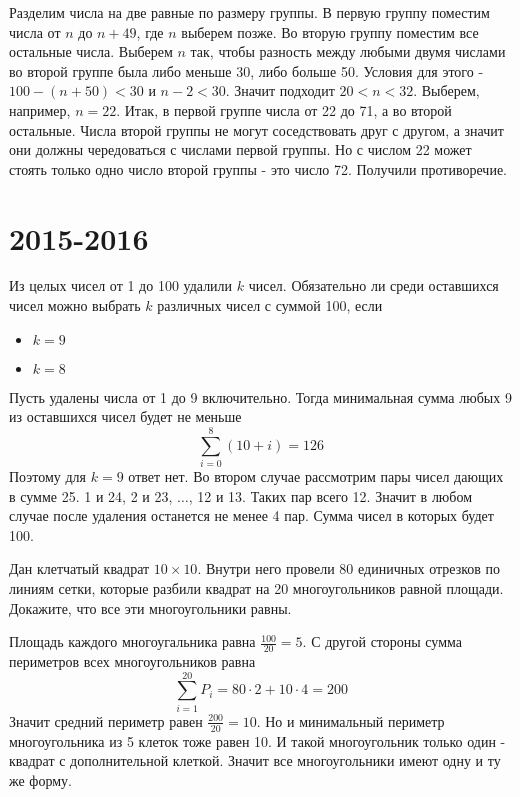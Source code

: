 \documentclass[11pt, a4paper]{template}
\begin{document}
\begin{solution}
Разделим числа на две равные по размеру группы. В первую группу поместим числа от $n$ до $n + 49$, где $n$ выберем позже. Во вторую группу поместим все остальные числа. Выберем $n$ так, чтобы разность между любыми двумя числами во второй группе была либо меньше 30, либо больше 50. Условия для этого - $100 - (n + 50) < 30$ и $n - 2 < 30$. Значит подходит $20 < n < 32$. Выберем, например, $n = 22$. Итак, в первой группе числа от 22 до 71, а во второй остальные. Числа второй группы не могут соседствовать друг с другом, а значит они должны чередоваться с числами первой группы. Но с числом 22 может стоять только одно число второй группы - это число 72. Получили противоречие.
\end{solution}

\chapter{2015-2016}

\begin{exercise}
Из целых чисел от 1 до 100 удалили $k$ чисел. Обязательно ли среди оставшихся чисел можно выбрать $k$ различных чисел с суммой 100, если
\begin{itemize}
\item $k = 9$
\item $k = 8$
\end{itemize}
\end{exercise}

\begin{solution}
Пусть удалены числа от 1 до 9 включительно. Тогда минимальная сумма любых 9 из оставшихся чисел будет не меньше 
$$
\sum_{i = 0}^{8} (10 + i) = 126
$$
Поэтому для $k = 9$ ответ нет. Во втором случае рассмотрим пары чисел дающих в сумме 25. 1 и 24, 2 и 23, $\dots$, 12 и 13. Таких пар всего 12. Значит в любом случае после удаления останется не менее 4 пар. Сумма чисел в которых будет 100.
\end{solution}

\begin{exercise}
Дан клетчатый квадрат $10 \times 10$. Внутри него провели 80 единичных отрезков по линиям сетки, которые разбили квадрат на 20 многоугольников равной площади. Докажите, что все эти многоугольники равны.
\end{exercise}

\begin{solution}
Площадь каждого многоугальника равна $\frac{100}{20} = 5$. С другой стороны сумма периметров всех многоугольников равна
$$
\sum_{i=1}^{20} P_{i} = 80 \cdot 2 + 10 \cdot 4 = 200
$$
Значит средний периметр равен $\frac{200}{20} = 10$. Но и минимальный периметр многоугольника из 5 клеток тоже равен 10. И такой многоугольник только один - квадрат с дополнительной клеткой. Значит все многоугольники имеют одну и ту же форму.
\end{solution}
\end{document}
